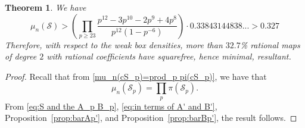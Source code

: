 \documentclass[12pt]{amsart}
\newtheorem{theorem}{Theorem}[section]
\newcommand{\cS}{\mathcal{S}}
\numberwithin{equation}{section}
\begin{document}
    \begin{theorem}\label{d=2 main thm}
       We have 
        $$\mu_n(\cS)>\left(\prod_{p\geq 23}\frac{p^{12}-3p^{10}-2p^9+4p^8}{p^{12}(1-p^{-6})}\right)\cdot 0.33843144838...>0.327$$
    Therefore, with respect to the weak box densities, more than $32.7$\% rational maps of degree $2$ with rational coefficients have squarefree, hence minimal, resultant.
    \end{theorem}
\begin{proof}
    Recall that from \eqref{mu_n(cS_p)=prod_p pi(cS_p)}, we have that 
    \[\mu_n(\cS_p)=\prod_p \pi(\cS_p).\]
     From \eqref{eq:S and the A_p B_p}, \eqref{eq:in terms of A' and B'}, Proposition~\ref{prop:barAp'}, and Proposition~\ref{prop:barBp'}, the result follows.
\end{proof}


\end{document}

